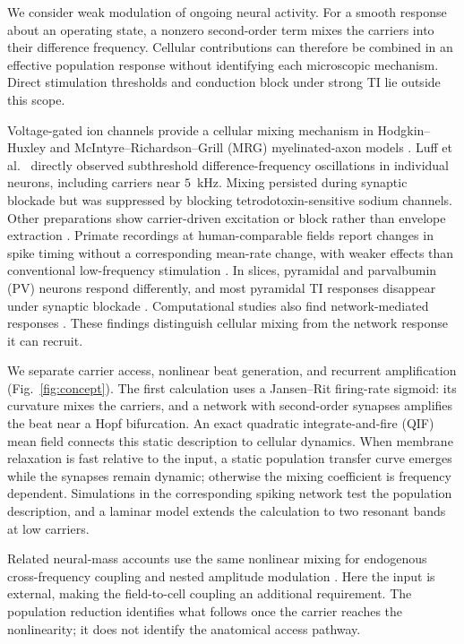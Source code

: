 \documentclass[11pt,a4paper]{article}
\providecommand{\DIFaddtex}[1]{{\protect\color{blue} \sf #1}} %
\providecommand{\DIFaddbegin}{} %
\providecommand{\DIFaddend}{} %
\providecommand{\DIFadd}[1]{\texorpdfstring{\DIFaddtex{#1}}{#1}} %
\begin{document}
\DIFaddbegin \DIFadd{We consider weak modulation of ongoing neural activity. For a smooth response
about an operating state, a nonzero second-order term mixes the carriers into
their difference frequency. Cellular contributions can therefore be combined in
an effective population response without identifying each microscopic mechanism.
Direct stimulation thresholds and conduction block under strong TI lie outside
this scope.
}

\DIFaddend Voltage-gated ion channels provide a cellular mixing mechanism in Hodgkin--Huxley
and McIntyre--Richardson--Grill (MRG) myelinated-axon models \cite{mirzakhalili2020}.
Luff et al.\ \cite{luff2024mixer} directly observed subthreshold difference-frequency
oscillations in individual neurons, including carriers near $5$~kHz. Mixing persisted
during synaptic blockade but was suppressed by blocking tetrodotoxin-sensitive sodium
channels. Other preparations show carrier-driven excitation or block rather than
envelope extraction \cite{opancar2025,peripheral2023,semenov2025}. Primate recordings at
human-comparable fields report changes in spike timing without a corresponding
mean-rate change, with weaker effects than conventional low-frequency stimulation
\cite{vieira2024}. In slices, pyramidal and parvalbumin (PV) neurons respond differently,
and most pyramidal TI responses disappear under synaptic blockade \cite{caldas2024}.
Computational studies also find network-mediated responses
\cite{karimi2024,soroushi2025,wangw2026}. These findings distinguish cellular mixing from
the network response it can recruit.

We separate carrier access, nonlinear beat generation, and recurrent amplification
(Fig.~\ref{fig:concept}). The first calculation uses a Jansen--Rit firing-rate sigmoid:
its curvature mixes the carriers, and a network with second-order synapses amplifies
the beat near a Hopf bifurcation. An exact quadratic integrate-and-fire (QIF) mean
field connects this static description to cellular dynamics. When membrane relaxation
is fast relative to the input, a static population transfer curve emerges while the
synapses remain dynamic; otherwise the mixing coefficient is frequency dependent.
Simulations in the corresponding spiking network test the population description,
and a laminar model extends the calculation to two resonant bands at low carriers.

Related neural-mass accounts use the same nonlinear mixing for endogenous
cross-frequency coupling and nested amplitude modulation
\cite{ruffini2025cfc,ruffini2025ham}. Here the input is external, making the
field-to-cell coupling an additional requirement. The population reduction identifies
what follows once the carrier reaches the nonlinearity; it does not identify the
anatomical access pathway.
\end{document}
